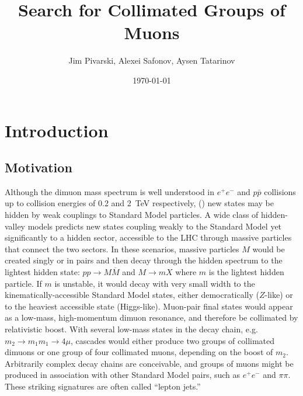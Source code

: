 \documentclass[12pt]{cms-tdr}
\title{Search for Collimated Groups of Muons}
\author{Jim Pivarski, Alexei Safonov, Aysen Tatarinov}
\date{\today}
\begin{document}
\maketitle

\section{Introduction}

\subsection{Motivation}


Although the dimuon mass spectrum is well understood in $e^+e^-$ and
$p\bar{p}$ collisions up to collision energies of 0.2 and 2~TeV
respectively, () new states may be hidden by
weak couplings to Standard Model particles.  A wide class of
hidden-valley models predicts new states coupling weakly to the
Standard Model yet significantly to a hidden sector, accessible to the
LHC through massive particles that connect the two sectors.  In these
scenarios, massive particles $M$ would be created singly or in pairs
and then decay through the hidden spectrum to the lightest hidden
state: $pp \to M\overline{M}$ and $M \to m X$ where $m$ is the
lightest hidden particle.  If $m$ is unstable, it would decay with
very small width to the kinematically-accessible Standard Model
states, either democratically ($Z$-like) or to the heaviest accessible
state (Higgs-like).  Muon-pair final states would appear as a
low-mass, high-momentum dimuon resonance, and therefore be collimated
by relativistic boost.  With several low-mass states in the decay
chain, e.g.\ $m_2 \to m_1 m_1 \to 4\mu$, cascades would either produce
two groups of collimated dimuons or one group of four collimated
muons, depending on the boost of $m_2$.  Arbitrarily complex decay
chains are conceivable, and groups of muons might be produced in
association with other Standard Model pairs, such as $e^+e^-$ and
$\pi\pi$.  These striking signatures are often called ``lepton jets.''
\end{document}
